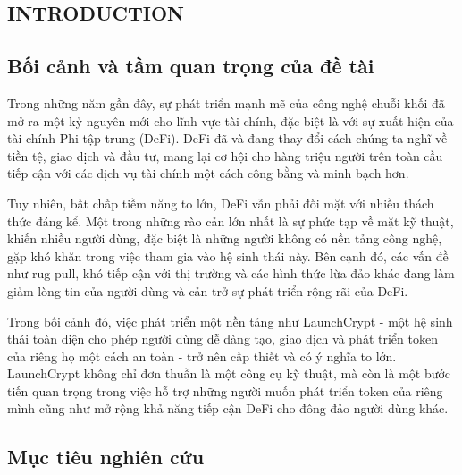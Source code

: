 \setcounter{page}{1}


\setlength{\parindent}{1cm}

\begin{center}
  \section*{INTRODUCTION}
\end{center}

\subsection*{Bối cảnh và tầm quan trọng của đề tài}

\hspace{\parindent}Trong những năm gần đây, sự phát triển mạnh mẽ của công nghệ
chuỗi khối đã mở ra một kỷ nguyên mới cho lĩnh vực tài chính, đặc biệt là với
sự xuất hiện của tài chính Phi tập trung (DeFi). DeFi đã và đang thay đổi cách
chúng ta nghĩ về tiền tệ, giao dịch và đầu tư, mang lại cơ hội cho hàng triệu
người trên toàn cầu tiếp cận với các dịch vụ tài chính một cách công bằng và
minh bạch hơn.

Tuy nhiên, bất chấp tiềm năng to lớn, DeFi vẫn phải đối mặt với nhiều thách
thức đáng kể. Một trong những rào cản lớn nhất là sự phức tạp về mặt kỹ thuật,
khiến nhiều người dùng, đặc biệt là những người không có nền tảng công nghệ,
gặp khó khăn trong việc tham gia vào hệ sinh thái này. Bên cạnh đó, các vấn đề
như rug pull, khó tiếp cận với thị trường và các hình thức lừa đảo khác đang
làm giảm lòng tin của người dùng và cản trở sự phát triển rộng rãi của DeFi.

Trong bối cảnh đó, việc phát triển một nền tảng như LaunchCrypt - một hệ sinh
thái toàn diện cho phép người dùng dễ dàng tạo, giao dịch và phát triển token
của riêng họ một cách an toàn - trở nên cấp thiết và có ý nghĩa to lớn.
LaunchCrypt không chỉ đơn thuần là một công cụ kỹ thuật, mà còn là một bước
tiến quan trọng trong việc hỗ trợ những người muốn phát triển token của riêng
mình cũng như mở rộng khả năng tiếp cận DeFi cho đông đảo người dùng khác.

\subsection*{Mục tiêu nghiên cứu}

